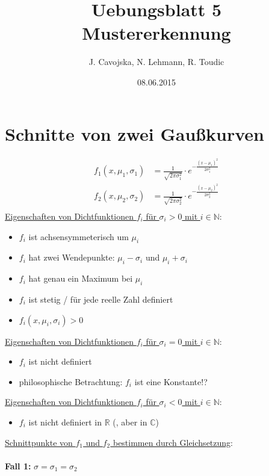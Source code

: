 \documentclass[12pt]{article}
\title{Uebungsblatt 5\\ \glqq Mustererkennung\grqq}
\author{J. Cavojska, N. Lehmann, R. Toudic}
\date{08.06.2015}
\begin{document}
\maketitle
\tableofcontents
\newpage

\section{Schnitte von zwei Gau\ss kurven}

\begin{align*}
f_1(x,\mu_1,\sigma_1) &= \frac{1}{\sqrt{2 \pi \sigma_1^2}} \cdot e^{-\frac{(x-\mu_1)^2}{2 \sigma_1^2}}\\
f_2(x,\mu_2,\sigma_2) &= \frac{1}{\sqrt{2 \pi \sigma_2^2}} \cdot e^{-\frac{(x-\mu_2)^2}{2 \sigma_2^2}}\\
\end{align*}
\underline{Eigenschaften von Dichtfunktionen $f_i$ f\"ur $\sigma_i > 0$ mit $i \in \mathbb{N}$}:
\begin{itemize}
\item $f_i$ ist achsensymmeterisch um $\mu_i$
\item $f_i$ hat zwei Wendepunkte: $\mu_i - \sigma_i$ und $\mu_i + \sigma_i$
\item $f_i$ hat genau ein Maximum bei $\mu_i$
\item $f_i$ ist stetig / f\"ur jede reelle Zahl definiert
\item $f_i(x,\mu_i,\sigma_i) > 0$
\end{itemize}
\underline{Eigenschaften von Dichtfunktionen $f_i$ f\"ur $\sigma_i = 0$ mit $i \in \mathbb{N}$}:
\begin{itemize}
\item $f_i$ ist nicht definiert
\item philosophische Betrachtung: $f_i$ ist eine Konstante!?
\end{itemize}
\underline{Eigenschaften von Dichtfunktionen $f_i$ f\"ur $\sigma_i < 0$ mit $i \in \mathbb{N}$}:
\begin{itemize}
\item $f_i$ ist nicht definiert in $\mathbb{R}$ (, aber in $\mathbb{C}$)
\end{itemize}
\newpage
\underline{Schnittpunkte von $f_1$ und $f_2$ bestimmen durch Gleichsetzung}:\\
\\
\textbf{Fall 1:} $\sigma = \sigma_1 = \sigma_2$\\
\end{document}
